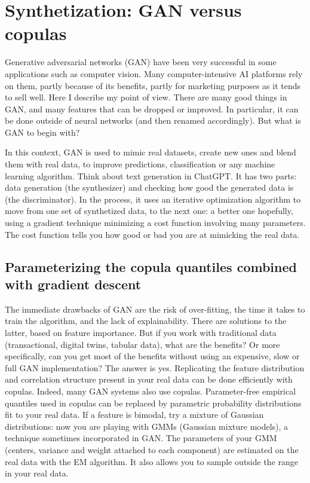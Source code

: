 \documentclass[oneside,10pt]{book}
\begin{document}
\section{Synthetization: GAN versus copulas}

\textcolor{index}{Generative adversarial networks} (GAN) have been very successful in some applications such as computer vision. Many computer-intensive AI platforms rely on them, partly because of its benefits, partly for marketing purposes as it tends to sell well. Here I describe my point of view. 
There are many good things in GAN, and many features that can be dropped or improved. In particular, it can be done outside of neural networks (and then renamed accordingly). But what is GAN to begin with?


In this context, GAN is used to mimic real datasets, create new ones and blend them with real data, to improve predictions, classification or any machine learning algorithm. Think about text generation in ChatGPT. It has two parts: data generation (the synthesizer) and checking how good the generated data is (the discriminator). In the process, it uses an iterative optimization algorithm to move from one set of synthetized data, to the next one: a better one hopefully, using a gradient technique minimizing a cost function involving many parameters. The cost function tells you how good or bad you are at mimicking the real data. 

\subsection{Parameterizing the copula quantiles combined with gradient descent}

The immediate drawbacks of GAN are the risk of over-fitting, the time it takes to train the algorithm, and the lack of explainability. There are solutions to the latter, based on feature importance. But if you work with traditional data (transactional, digital twins, tabular data), what are the benefits? Or more specifically, can you get most of the benefits without using an expensive, slow or full GAN implementation?
The answer is yes. Replicating the feature distribution and correlation structure present in your real data can be done efficiently with copulas.  Indeed, many GAN systems also use copulas. Parameter-free empirical quantiles used in copulas  can be replaced by parametric probability distributions fit to your real data. If a feature is bimodal, try a mixture of Gaussian distributions: 
now you are playing with GMMs (\textcolor{index}{Gaussian mixture models}), a technique sometimes incorporated in GAN. The parameters of your GMM (centers, variance and weight attached to each component) are estimated on the real data with the \textcolor{index}{EM algorithm}. It also allows you to sample outside the range in your real data.
\end{document}

